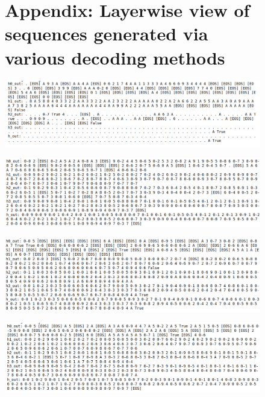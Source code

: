\documentclass[10pt,a4paper]{article}
\begin{document}
\begin{figure}[p]
    \centering
    \section{Appendix: Layerwise view of sequences generated via various decoding methods}
    \vspace{-0.5em}  %
    
    \includegraphics[width=\textwidth,height=0.19\textheight,keepaspectratio]{greedy_decoding.png}
    \label{fig:greedy}
    
    \vspace{0.5em}
    
    \includegraphics[width=\textwidth,height=0.19\textheight,keepaspectratio]{rank2_decoding.png}
    \label{fig:rank2}
    
    \vspace{0.5em}
    
    \includegraphics[width=\textwidth,height=0.19\textheight,keepaspectratio]{our_method_decoding.png}
    \label{fig:our-method}
    
    \vspace{0.5em}
    
    \includegraphics[width=\textwidth,height=0.19\textheight,keepaspectratio]{random_tokens_decoding.png}
    \label{fig:random}
\end{figure}
\end{document}

